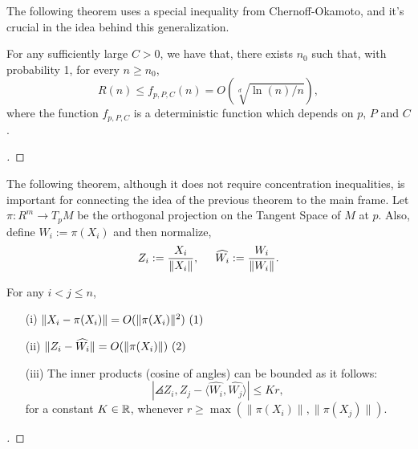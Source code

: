 The following theorem uses a special inequality from Chernoff-Okamoto, and it's crucial in the idea behind this generalization.

\begin{theorem}\label{ade:T2}
  For any sufficiently large $C > 0$, we have that, there exists $n_0$ such that, with probability 1, for every $n \geq n_0$,
  \begin{equation}\label{ade:3}
    R(n) \leq f_{p,P,C}(n) = O(\sqrt[d]{\ln(n)/n}),
  \end{equation}
  where the function $f_{p,P,C}$ is a deterministic function which depends on $p,\, P$ and $C$.
\end{theorem}

\begin{proof}[]

\end{proof}

\vspace*{0.5 em}

The following theorem, although it does not require concentration inequalities, is important for connecting the idea of the previous theorem to the main frame. Let $\pi : R^m \to T_p M$ be the orthogonal projection on the Tangent Space of $M$ at $p$. Also, define $W_i := \pi(X_i)$ and then normalize,
\begin{equation}\label{ade:4}
  Z_i := \frac{X_i}{\|X_i\|},\hspace*{5mm} \widehat{W_i} := \frac{W_i}{\|W_i\|}.
\end{equation}

\begin{theorem}\label{ade:T3}
  For any $i<j \leq n$,
  \begin{enumerate}
    \item[(i)]    \( \|X_i-\pi(X_i)\|  =   O(\|\pi (X_i)\|^2) \hfill\inlinetag  \)
    \item[(ii)]   \( \|Z_i-\widehat{W_i}\|  =   O(\|\pi (X_i) \|) \hfill\inlinetag \)
    \item[(iii)]  The inner products (cosine of angles) can be bounded as it follows:
    \begin{equation}\label{ade:7}
      |\angles{Z_i,Z_j} - \langle\widehat{W_i}, \widehat{W_j}\rangle| \leq K r,
    \end{equation}
    for a constant $K\in\mathbb{R}$, whenever $r \geq \max (\|\pi(X_i)\|,\|\pi(X_j)\|)$.
  \end{enumerate}
\end{theorem}
\begin{proof}[]

\end{proof}

